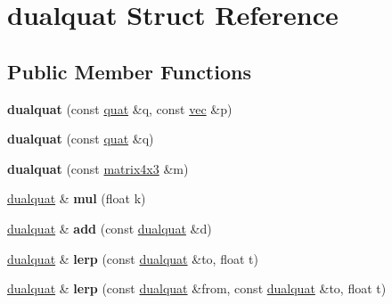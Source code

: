 \hypertarget{structdualquat}{}\section{dualquat Struct Reference}
\label{structdualquat}
\subsection*{Public Member Functions}
\begin{DoxyCompactItemize}
\item 
\mbox{\label{structdualquat_af485158a42a402ee5f99852fb0a0f3fb}} 
{\bfseries dualquat} (const \hyperlink{structquat}{quat} \&q, const \hyperlink{structvec}{vec} \&p)
\item 
\mbox{\label{structdualquat_a33f70256fa19bb34537f63e0fef1264c}} 
{\bfseries dualquat} (const \hyperlink{structquat}{quat} \&q)
\item 
\mbox{\label{structdualquat_a81399da7ab3d67c713c2b191bcdc06af}} 
{\bfseries dualquat} (const \hyperlink{structmatrix4x3}{matrix4x3} \&m)
\item 
\mbox{\label{structdualquat_a904d696a0b2b2458a1ed33363f383bec}} 
\hyperlink{structdualquat}{dualquat} \& {\bfseries mul} (float k)
\item 
\mbox{\label{structdualquat_a520295bb77d6bc2271cc4ca0208398ee}} 
\hyperlink{structdualquat}{dualquat} \& {\bfseries add} (const \hyperlink{structdualquat}{dualquat} \&d)
\item 
\mbox{\label{structdualquat_a71fa02bd086ed83c2bd8054ee8e7e65e}} 
\hyperlink{structdualquat}{dualquat} \& {\bfseries lerp} (const \hyperlink{structdualquat}{dualquat} \&to, float t)
\item 
\mbox{\label{structdualquat_a705eb3df45e1bf19cf578eb16423cdc8}} 
\hyperlink{structdualquat}{dualquat} \& {\bfseries lerp} (const \hyperlink{structdualquat}{dualquat} \&from, const \hyperlink{structdualquat}{dualquat} \&to, float t)
\item 
\mbox{\label{structdualquat_a3462e3334e37b494d0453c4048834a78}} 

\end{DoxyCompactItemize}
